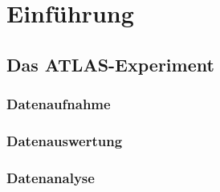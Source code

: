 \section{Einführung}
\subsection{Das ATLAS-Experiment}

\subsubsection{Datenaufnahme}
\subsubsection{Datenauswertung}
\subsubsection{Datenanalyse}


